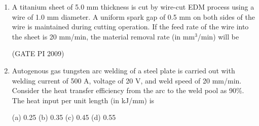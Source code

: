 \documentclass[journal,12pt,onecolumn]{IEEEtran}
\theoremstyle{remark}
\begin{document}
\begin{enumerate}[label=Q.\arabic*]
\begin{enumerate}
\begin{multicols}{2}
\end{multicols}
\end{enumerate}
\hfill (GATE PI 2009)
\item A titanium sheet of 5.0 mm thickness is cut by wire-cut EDM process using a wire of 1.0 mm diameter. A uniform spark gap of 0.5 mm on both sides of the wire is maintained during cutting operation. If the feed rate of the wire into the sheet is 20 mm/min, the material removal rate (in mm$^3$/min) will be
\begin{enumerate}
\end{enumerate}
\hfill (GATE PI 2009)
\item Autogenous gas tungsten arc welding of a steel plate is carried out with welding current of 500 A, voltage of 20 V, and weld speed of 20 mm/min. Consider the heat transfer efficiency from the arc to the weld pool as 90\%. The heat input per unit length (in kJ/mm) is

(a) 0.25 \hfill (b) 0.35 \hfill(c) 0.45 \hfill (d) 0.55 \\


\end{enumerate}
\end{document}
